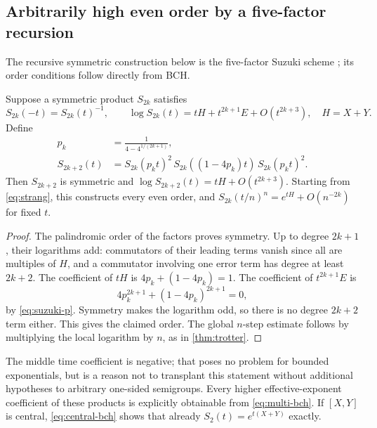 \subsection{Arbitrarily high even order by a five-factor recursion}
The recursive symmetric construction below is the five-factor Suzuki scheme \cite{Suzuki}; its order conditions follow directly from BCH.

\begin{theorem}\label{thm:suzuki}
Suppose a symmetric product $S_{2k}$ satisfies
\[
 S_{2k}(-t)=S_{2k}(t)^{-1},\qquad
 \log S_{2k}(t)=tH+t^{2k+1}E+O(t^{2k+3}),\quad H=X+Y.
\]
Define
\begin{align}
 p_k&=\frac1{4-4^{1/(2k+1)}},\label{eq:suzuki-p}\\
 S_{2k+2}(t)&=S_{2k}(p_kt)^2\,
 S_{2k}((1-4p_k)t)\,S_{2k}(p_kt)^2.\label{eq:suzuki-recursion}
\end{align}
Then $S_{2k+2}$ is symmetric and
$\log S_{2k+2}(t)=tH+O(t^{2k+3})$.
Starting from \cref{eq:strang}, this constructs every even order, and
$S_{2k}(t/n)^n=e^{tH}+O(n^{-2k})$ for fixed $t$.
\end{theorem}
\begin{proof}
The palindromic order of the factors proves symmetry. Up to degree $2k+1$, their logarithms add: commutators of their leading terms vanish since all are multiples of $H$, and a commutator involving one error term has degree at least $2k+2$. The coefficient of $tH$ is $4p_k+(1-4p_k)=1$. The coefficient of $t^{2k+1}E$ is
\[
 4p_k^{2k+1}+(1-4p_k)^{2k+1}=0,
\]
by \cref{eq:suzuki-p}. Symmetry makes the logarithm odd, so there is no degree $2k+2$ term either. This gives the claimed order. The global $n$-step estimate follows by multiplying the local logarithm by $n$, as in \cref{thm:trotter}.
\end{proof}
The middle time coefficient is negative; that poses no problem for bounded exponentials, but is a reason not to transplant this statement without additional hypotheses to arbitrary one-sided semigroups. Every higher effective-exponent coefficient of these products is explicitly obtainable from \cref{eq:multi-bch}. If $[X,Y]$ is central, \cref{eq:central-bch} shows that already $S_2(t)=e^{t(X+Y)}$ exactly.

